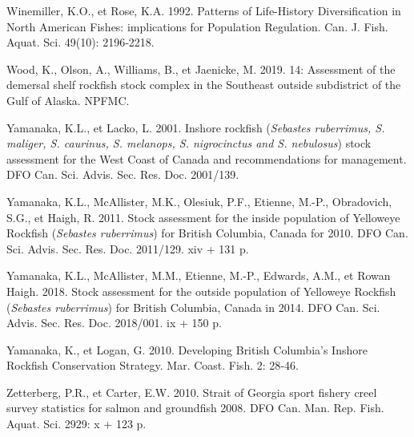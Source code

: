 \documentclass[french,11pt]{book}
\begin{document}
\leavevmode\hypertarget{ref-winemiller1992}{}%
Winemiller, K.O., et Rose, K.A. 1992. Patterns of Life-History Diversification in North American Fishes: implications for Population Regulation. Can. J. Fish. Aquat. Sci. 49(10): 2196‑2218.

\leavevmode\hypertarget{ref-wood2019}{}%
Wood, K., Olson, A., Williams, B., et Jaenicke, M. 2019. 14: Assessment of the demersal shelf rockfish stock complex in the Southeast outside subdistrict of the Gulf of Alaska. NPFMC.

\leavevmode\hypertarget{ref-yamanaka2001}{}%
Yamanaka, K.L., et Lacko, L. 2001. Inshore rockfish (\emph{Sebastes ruberrimus, S. maliger, S. caurinus, S. melanops, S. nigrocinctus and S. nebulosus}) stock assessment for the West Coast of Canada and recommendations for management. DFO Can. Sci. Advis. Sec. Res. Doc. 2001/139.

\leavevmode\hypertarget{ref-yamanaka2011}{}%
Yamanaka, K.L., McAllister, M.K., Olesiuk, P.F., Etienne, M.-P., Obradovich, S.G., et Haigh, R. 2011. Stock assessment for the inside population of Yelloweye Rockfish (\emph{Sebastes ruberrimus}) for British Columbia, Canada for 2010. DFO Can. Sci. Advis. Sec. Res. Doc. 2011/129. xiv + 131 p.

\leavevmode\hypertarget{ref-yamanaka2018yelloweyeoutside}{}%
Yamanaka, K.L., McAllister, M.M., Etienne, M.-P., Edwards, A.M., et Rowan Haigh. 2018. Stock assessment for the outside population of Yelloweye Rockfish (\emph{Sebastes ruberrimus}) for British Columbia, Canada in 2014. DFO Can. Sci. Advis. Sec. Res. Doc. 2018/001. ix + 150 p.

\leavevmode\hypertarget{ref-yamanaka2010}{}%
Yamanaka, K., et Logan, G. 2010. Developing British Columbia's Inshore Rockfish Conservation Strategy. Mar. Coast. Fish. 2: 28‑46.

\leavevmode\hypertarget{ref-zetterberg2010}{}%
Zetterberg, P.R., et Carter, E.W. 2010. Strait of Georgia sport fishery creel survey statistics for salmon and groundfish 2008. DFO Can. Man. Rep. Fish. Aquat. Sci. 2929: x + 123 p.

\setlength{\parindent}{0in} \setlength{\leftskip}{0in} \setlength{\parskip}{4pt}

\clearpage

\Appendices


\clearpage

\label{app:biological-data}
\end{document}
